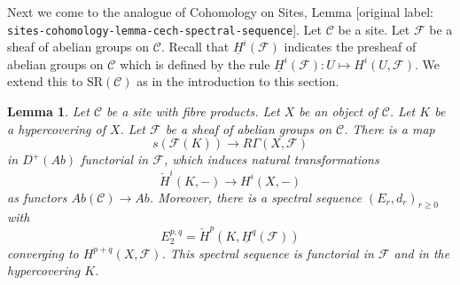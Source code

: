 \documentclass[10pt,a4paper]{article}
\theoremstyle{plain}
\newtheorem{lemma}[subsection]{Lemma}
\theoremstyle{definition}
\theoremstyle{remark}
\numberwithin{equation}{subsection}
\begin{document}
\noindent
Next we come to the analogue of Cohomology on Sites, Lemma
\textnormal{[original label: \nolinkurl{sites-cohomology-lemma-cech-spectral-sequence}]}.
Let $\mathcal{C}$ be a site.
Let $\mathcal{F}$ be a sheaf of abelian groups on $\mathcal{C}$.
Recall that $\underline{H}^i(\mathcal{F})$ indicates the presheaf
of abelian groups on $\mathcal{C}$ which is defined by the
rule $\underline{H}^i(\mathcal{F}) : U \longmapsto H^i(U, \mathcal{F})$.
We extend this to $\text{SR}(\mathcal{C})$ as in the introduction
to this section.

\begin{lemma}
\label{lemma-cech-spectral-sequence}
Let $\mathcal{C}$ be a site with fibre products.
Let $X$ be an object of $\mathcal{C}$.
Let $K$ be a hypercovering of $X$.
Let $\mathcal{F}$ be a sheaf of abelian groups on $\mathcal{C}$.
There is a map
$$
s(\mathcal{F}(K))
\longrightarrow
R\Gamma(X, \mathcal{F})
$$
in $D^{+}(\textit{Ab})$ functorial in $\mathcal{F}$, which induces
natural transformations
$$
\check{H}^i(K, -) \longrightarrow H^i(X, -)
$$
as functors $\textit{Ab}(\mathcal{C}) \to \textit{Ab}$. Moreover,
there is a spectral sequence $(E_r, d_r)_{r \geq 0}$ with
$$
E_2^{p, q} = \check{H}^p(K, \underline{H}^q(\mathcal{F}))
$$
converging to $H^{p + q}(X, \mathcal{F})$.
This spectral sequence is functorial in $\mathcal{F}$ and
in the hypercovering $K$.
\end{lemma}
\end{document}

